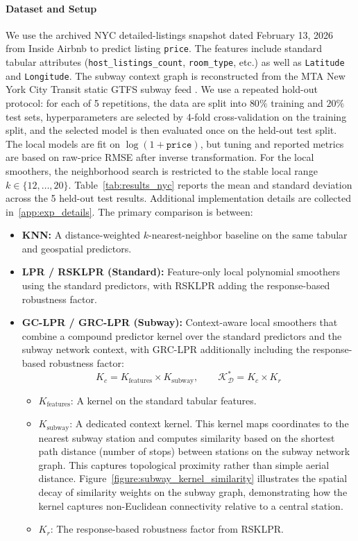 \documentclass[final,1p,times,authoryear]{elsarticle}
\newcommand{\D}{\mathcal{D}}
\newcommand{\K}{\mathcal{K}}
\begin{document}
\paragraph{\textbf{Dataset and Setup}}
We use the archived NYC detailed-listings snapshot dated February 13, 2026 from Inside Airbnb \citep{insideairbnb2026nyc} to predict listing \texttt{price}. The features include standard tabular attributes (\texttt{host\_listings\_count}, \texttt{room\_type}, etc.) as well as \texttt{Latitude} and \texttt{Longitude}. The subway context graph is reconstructed from the MTA New York City Transit static GTFS subway feed \citep{mta_gtfs_subway_2026}. We use a repeated hold-out protocol: for each of 5 repetitions, the data are split into \(80\%\) training and \(20\%\) test sets, hyperparameters are selected by 4-fold cross-validation on the training split, and the selected model is then evaluated once on the held-out test split. The local models are fit on \(\log(1+\texttt{price})\), but tuning and reported metrics are based on raw-price RMSE after inverse transformation. For the local smoothers, the neighborhood search is restricted to the stable local range \(k \in \{12,\ldots,20\}\). Table~\ref{tab:results_nyc} reports the mean and standard deviation across the 5 held-out test results. Additional implementation details are collected in~\ref{app:exp_details}.
The primary comparison is between:

\begin{itemize}
    \item \textbf{KNN:} A distance-weighted \(k\)-nearest-neighbor baseline on the same tabular and geospatial predictors.
    \item \textbf{LPR / RSKLPR (Standard):} Feature-only local polynomial smoothers using the standard predictors, with RSKLPR adding the response-based robustness factor.
    \item \textbf{GC-LPR / GRC-LPR (Subway):} Context-aware local smoothers that combine a compound predictor kernel over the standard predictors and the subway network context, with GRC-LPR additionally including the response-based robustness factor:
    $$
    K_c = K_{\text{features}} \times K_{\text{subway}},
    \qquad
    \K_{\D}^* = K_c \times K_r
    $$
    \begin{itemize}
        \item $K_{\text{features}}$: A kernel on the standard tabular features.
        \item $K_{\text{subway}}$: A dedicated context kernel. This kernel maps coordinates to the nearest subway station and computes similarity based on the shortest path distance (number of stops) between stations on the subway network graph. This captures topological proximity rather than simple aerial distance. Figure~\ref{figure:subway_kernel_similarity} illustrates the spatial decay of similarity weights on the subway graph, demonstrating how the kernel captures non-Euclidean connectivity relative to a central station.
        \item $K_r$: The response-based robustness factor from RSKLPR.
    \end{itemize}
\end{itemize}
\end{document}
